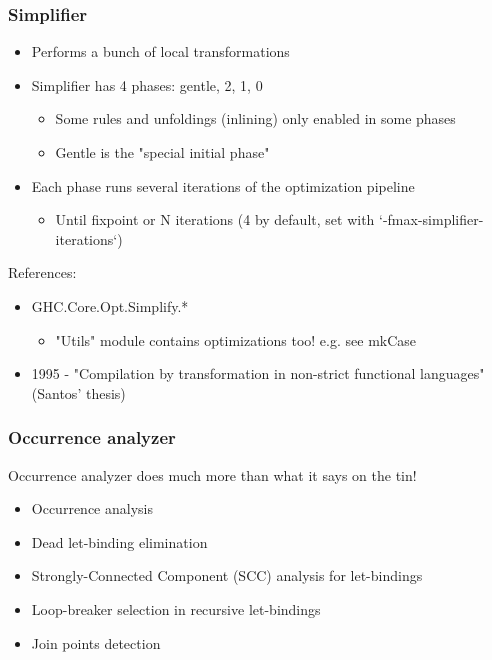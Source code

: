\documentclass[aspectratio=169]{beamer}
\begin{document}
\begin{frame}
  \frametitle{Simplifier}
  \begin{itemize}
    \item Performs a bunch of local transformations
    \item Simplifier has 4 phases: gentle, 2, 1, 0
      \begin{itemize}
        \item Some rules and unfoldings (inlining) only enabled in some phases
        \item Gentle is the "special initial phase"
      \end{itemize}
    \item Each phase runs several iterations of the optimization pipeline
      \begin{itemize}
        \item Until fixpoint or N iterations (4 by default, set with
          `-fmax-simplifier-iterations`)
      \end{itemize}
  \end{itemize}

  References:
  \begin{itemize}
    \item GHC.Core.Opt.Simplify.*
      \begin{itemize}
        \item "Utils" module contains optimizations too! e.g. see mkCase
      \end{itemize}
    \item 1995 - "Compilation by transformation in non-strict functional
      languages" (Santos' thesis)
  \end{itemize}
\end{frame}

\begin{frame}
  \frametitle{Occurrence analyzer}

  Occurrence analyzer does much more than what it says on the tin!

  \begin{itemize}
    \item Occurrence analysis
    \item Dead let-binding elimination
    \item Strongly-Connected Component (SCC) analysis for let-bindings
    \item Loop-breaker selection in recursive let-bindings
    \item Join points detection
  \end{itemize}
\end{frame}
\end{document}
